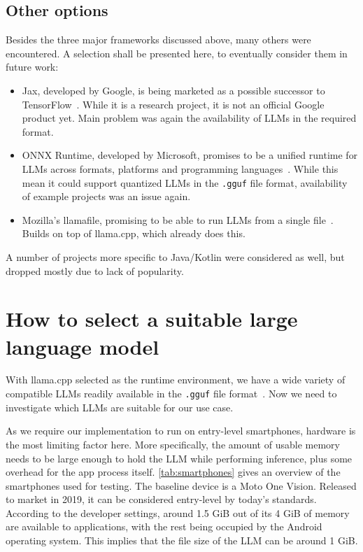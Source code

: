 \subsection{Other options}
\label{sec:otherOptions}
Besides the three major frameworks discussed above, many others were encountered. A selection shall be presented here, to eventually consider them in future work:
\begin{itemize}
	\item Jax, developed by Google, is being marketed as a possible successor to TensorFlow~\cite{jaxJaxmlJax2025}. While it is a research project, it is not an official Google product yet. Main problem was again the availability of \glspl{LLM} in the required format.
	\item ONNX Runtime, developed by Microsoft, promises to be a unified runtime for \glspl{LLM} across formats, platforms and programming languages~\cite{onnxruntimedevelopersONNXRuntime2018,onnxruntimeONNXRuntimeHome}. While this mean it could support quantized \glspl{LLM} in the \lstinline|.gguf| file format, availability of example projects was an issue again.
	\item Mozilla's llamafile, promising to be able to run \glspl{LLM} from a single file~\cite{mozillaMozillaOchoLlamafile2025,hoodIntroducingLlamafileMozilla2023}. Builds on top of llama.cpp, which already does this.
\end{itemize}

A number of projects more specific to Java/Kotlin were considered as well, but dropped mostly due to lack of popularity.

\section{How to select a suitable large language model}
\label{sec:howToSelectASuitableLLM}
With llama.cpp selected as the runtime environment, we have a wide variety of compatible \glspl{LLM} readily available in the \lstinline|.gguf| file format~\cite{huggingfaceModelsHuggingFace2025}. Now we need to investigate which \glspl{LLM} are suitable for our use case.

As we require our implementation to run on entry-level smartphones, hardware is the most limiting factor here. More specifically, the amount of usable memory needs to be large enough to hold the \gls{LLM} while performing inference, plus some overhead for the app process itself. \cref{tab:smartphones} gives an overview of the smartphones used for testing. The baseline device is a Moto One Vision. Released to market in 2019, it can be considered entry-level by today's standards. According to the developer settings, around 1.5 GiB out of its 4 GiB of memory are available to applications, with the rest being occupied by the Android operating system. This implies that the file size of the \gls{LLM} can be around 1 GiB.

